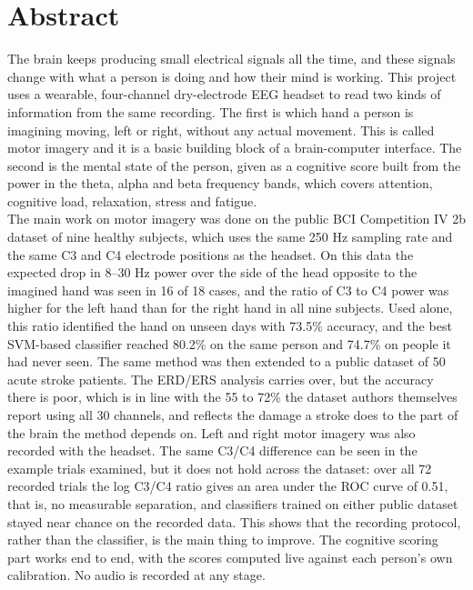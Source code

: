 \chapter*{Abstract}
\thispagestyle{plain}
The brain keeps producing small electrical signals all the time, and these signals change
with what a person is doing and how their mind is working. This project uses a wearable,
four-channel dry-electrode EEG headset to read two kinds of information from the same
recording. The first is which hand a person is imagining moving, left or right, without any
actual movement. This is called motor imagery and it is a basic building block of a
brain-computer interface. The second is the mental state of the person, given as a
cognitive score built from the power in the theta, alpha and beta frequency bands, which
covers attention, cognitive load, relaxation, stress and fatigue.\\

The main work on motor imagery was done on the public BCI Competition IV 2b dataset of
nine healthy subjects, which uses the same 250 Hz sampling rate and the same C3 and C4
electrode positions as the headset. On this data the expected drop in 8--30 Hz power over the side
of the head opposite to the imagined hand was seen in 16 of 18 cases, and the ratio of C3
to C4 power was higher for the left hand than for the right hand in all nine subjects.
Used alone, this ratio identified the hand on unseen days with 73.5\% accuracy, and the
best SVM-based classifier reached 80.2\% on the same person and 74.7\% on people it had
never seen. The same method was then extended to a public dataset of 50 acute stroke
patients. The ERD/ERS analysis carries over, but the accuracy there is poor, which is in
line with the 55 to 72\% the dataset authors themselves report using all 30 channels, and
reflects the damage a stroke does to the part of the brain the method depends on. Left and
right motor imagery was also recorded with the headset. The same C3/C4 difference can be
seen in the example trials examined, but it does not hold across the dataset: over all 72
recorded trials the log C3/C4 ratio gives an area under the ROC curve of 0.51, that is, no
measurable separation, and classifiers trained on either public dataset stayed near chance
on the recorded data. This shows that the recording
protocol, rather than the classifier, is the main thing to improve. The cognitive scoring
part works end to end, with the scores computed live against each person's own
calibration. No audio is recorded at any stage.
